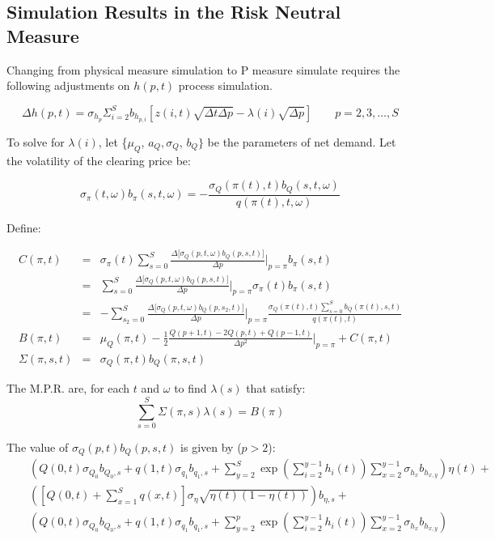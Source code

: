 \documentclass{article}
\begin{document}
\subsection{Simulation Results in the Risk Neutral Measure}
Changing from physical measure simulation to P measure simulate requires the following adjustments on $h(p,t)$ process simulation.

$$
\Delta h(p,t) = \sigma_{h_p} \Sigma_{i=2}^{S} b_{h_{p, i}} [z(i,t) \sqrt{\Delta t \Delta p} - \lambda(i)\sqrt{\Delta p}] \qquad p = 2, 3, \ldots, S
$$

To solve for $\lambda(i)$, let \{$\mu _{Q}$, $a_{Q},\sigma _{Q}$, $b_{Q}\}$ be the parameters of net demand.
Let the volatility of the clearing price be:

\begin{equation*}
\sigma _{\pi }(t,\omega )b_{\pi }(s,t,\omega )=-\frac{\sigma _{Q}(\pi
(t),t)b_{Q}(s,t,\omega )}{q(\pi (t),t,\omega )}
\end{equation*}
\bigskip

Define:

\begin{eqnarray*}
C(\pi ,t) &=&\sigma _{\pi }(t)\sum_{s=0}^{S}\frac{\Delta \lbrack \sigma_{Q}(p,t,\omega )b_{Q}(p,s,t)]}{\Delta p}|_{p=\pi }b_{\pi }(s,t) \\
&=&\sum_{s=0}^{S}\frac{\Delta \lbrack \sigma _{Q}(p,t,\omega )b_{Q}(p,s,t)]}{\Delta p}|_{p=\pi }\sigma _{\pi }(t)b_{\pi }(s,t) \\
&=&-\sum_{s_{2}=0}^{S}\frac{\Delta \lbrack \sigma _{Q}(p,t,\omega)b_{Q}(p,s_{2},t)]}{\Delta p}|_{p=\pi }\frac{\sigma _{Q}(\pi(t),t)\sum_{s=0}^{S}b_{Q}(\pi (t),s,t)}{q(\pi (t),t)} \\
B(\pi ,t) &=&\mu _{Q}(\pi ,t)-\frac{1}{2}\frac{Q(p+1,t) - 2Q(p,t) + Q(p-1,t)}{\Delta p^{2}}|_{p=\pi }+C(\pi ,t) \\
\Sigma (\pi ,s,t) &=&\sigma _{Q}(\pi ,t)b_{Q}(\pi ,s,t)
\end{eqnarray*}
\bigskip

The M.P.R. are, for each $t$ and $\omega $ to find $\lambda (s)$ that
satisfy:%
\begin{equation*}
\sum_{s=0}^{S}\Sigma (\pi ,s)\lambda (s) = B(\pi )
\end{equation*}

The value of $\sigma _{Q}(p,t)b_{Q}(p,s,t)$ is given by ($p > 2$):%
\begin{eqnarray*}
&&\left( Q(0,t)\sigma _{Q_{0}}b_{Q_{0},s}+q(1,t)\sigma _{q_{1}}b_{q_{1},s}+\sum_{y=2}^{S}\exp
(\sum_{i=2}^{y-1}h_{i}(t))\sum_{x=2}^{y-1}\sigma_{h_{x}}b_{h_{x,y}}\right) \eta (t)+ \\
&&\left( [Q(0,t)+\sum_{x=1}^{S}q(x,t)]\sigma _{\eta }\sqrt{\eta (t)(1-\eta
(t))}\right) b_{\eta ,s}+ \\
&&\left( Q(0,t)\sigma_{Q_{0}}b_{Q_{0},s}+q(1,t)\sigma_{q_{1}}b_{q_{1},s}+\sum_{y=2}^{p}\exp
(\sum_{i=2}^{y-1}h_{i}(t))\sum_{x=2}^{y-1}\sigma_{h_{x}}b_{h_{x,y}}\right)
\end{eqnarray*}
\end{document}
